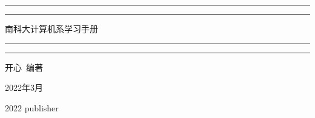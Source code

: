 
\begin{titlepage}
    \centering   %
    \scshape     %
    \vspace*{\baselineskip}   %

	
    \rule{\textwidth}{1.6pt}\vspace*{-\baselineskip}\vspace*{2pt} %
    \rule{\textwidth}{0.4pt}  %
	
    \vspace{0.75\baselineskip} %

    {\LARGE\heiti 南科大计算机系学习手册} %
	
	\vspace{0.75\baselineskip} %
	
	\rule{\textwidth}{0.4pt}\vspace*{-\baselineskip}\vspace{3.2pt} %
	\rule{\textwidth}{1.6pt} %
	
	\vspace{2\baselineskip} %
	
	
    {\fangsong\Large 开心~编著 \\[10pt] } %
	
    {\fangsong\large 2022年3月\\} %

	\vspace{0.5\baselineskip} %
	
	
	\vfill %
	
	
	
	\vspace{0.3\baselineskip} %
	
	2022 %
	{\large publisher} %
\end{titlepage}
